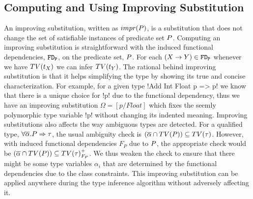 \documentclass[format=acmsmall,manuscript,review,screen,nonacm,margin=1in,11pt]{acmart}
\begin{document}
\subsection{Computing and Using Improving Substitution}\label{subsec:fd-improve}
An improving substitution, written as $impr(P)$, is a substitution that does not change the set of
satisfiable instances of predicate set $P$.
Computing an improving substitution is straightforward with the induced functional
dependencies, $\texttt{FD}_\texttt{P}$, on the predicate set, $P$.
For each $(X \to Y)\in\texttt{FD}_\texttt{P}$
whenever we have $TV(t_X)$ we can infer $TV(t_Y)$. The rational behind
improving substitution is that it helps simplifying the type by showing its true
and concise characterization. For example, for a given type !Add Int Float p => p!
we know that there is a unique choice for !p! due to the functional dependency,
thus we have an improving substitution $\Omega = [p/Float]$ which
fixes the seemly polymorphic type variable !p! without changing its indented meaning.
Improving substitutions also affects the way ambiguous types are detected.
For a qualified type, $\forall\overline{\alpha}.P\Rightarrow\tau$, the usual ambiguity
check is $(\overline{\alpha}\cap TV(P)) \subseteq TV(\tau)$. However, with induced functional dependencies $F_P$
due to $P$, the appropriate check would be $(\overline{\alpha}\cap TV(P)) \subseteq {TV(\tau)}^{+}_{F_P}$.
We thus weaken the check to ensure that there might be some type variables $\alpha_i$ that are determined by the
functional dependencies due to the class constraints. This improving substitution can be applied
anywhere during the type inference algorithm without adversely affecting it.
\end{document}
